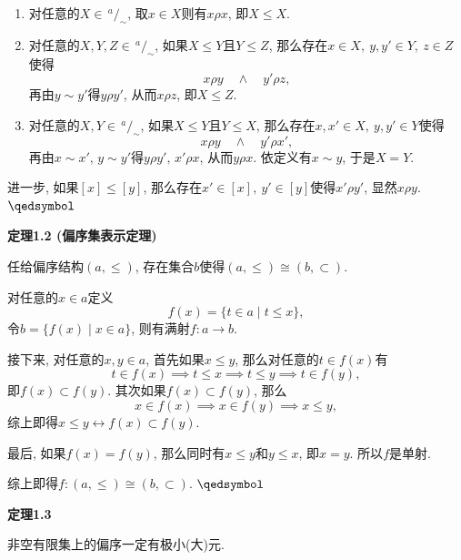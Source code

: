 \documentclass[UTF8]{ctexart}
\begin{document}

\begin{enumerate}
    \item 对任意的$X\in\,^{\displaystyle a}\!/_{\displaystyle\sim}$,
    取$x\in X$则有$x\rho x$, 即$X\leqslant X$.
    \item 对任意的$X,Y,Z\in\,^{\displaystyle a}\!/_{\displaystyle\sim}$,
    如果$X\leqslant Y$且$Y\leqslant Z$, 那么存在$x\in X,\ y,y'\in Y,\ z\in Z$使得
    \[
        x\rho y\quad\land\quad y'\rho z,
    \]
    再由$y\sim y'$得$y\rho y'$, 从而$x\rho z$, 即$X\leqslant Z$.
    \item 对任意的$X,Y\in\,^{\displaystyle a}\!/_{\displaystyle\sim}$,
    如果$X\leqslant Y$且$Y\leqslant X$, 那么存在$x,x'\in X,\ y,y'\in Y$使得
    \[
        x\rho y\quad\land\quad y'\rho x',
    \]
    再由$x\sim x',\,y\sim y'$得$y\rho y',\,x'\rho x$, 从而$y\rho x$.
    依定义有$x\sim y$, 于是$X=Y$.
\end{enumerate}

进一步, 如果$[x]\leqslant[y]$, 那么存在$x'\in[x],\ y'\in[y]$使得$x'\rho y'$,
显然$x\rho y$. {\hfill $\qedsymbol$}






\newpage

\hypertarget{sec:定理1.2}{}
\noindent\textbf{定理1.2 (偏序集表示定理)}

任给偏序结构$(a,\leqslant)$, 存在集合$b$使得$(a,\leqslant)\cong(b,\subset)$.


对任意的$x\in a$定义
\[
    f(x)=\{t\in a\mid t\leqslant x\},
\]
令$b=\{f(x)\mid x\in a\}$, 则有满射$f:a\to b$.

接下来, 对任意的$x,y\in a$, 首先如果$x\leqslant y$, 那么对任意的$t\in f(x)$有
\[
    t\in f(x)\implies t\leqslant x\implies
    t\leqslant y\implies t\in f(y),
\]
即$f(x)\subset f(y)$. 其次如果$f(x)\subset f(y)$, 那么
\[
    x\in f(x)\implies x\in f(y)\implies x\leqslant y,
\]
综上即得$x\leqslant y\leftrightarrow f(x)\subset f(y)$.

最后, 如果$f(x)=f(y)$, 那么同时有$x\leqslant y$和$y\leqslant x$,
即$x=y$. 所以$f$是单射.

综上即得$f:(a,\leqslant)\cong(b,\subset)$. {\hfill $\qedsymbol$}

\vspace{10pt}

\hypertarget{sec:定理1.3}{}
\noindent\textbf{定理1.3}

非空有限集上的偏序一定有极小(大)元.
\end{document}
